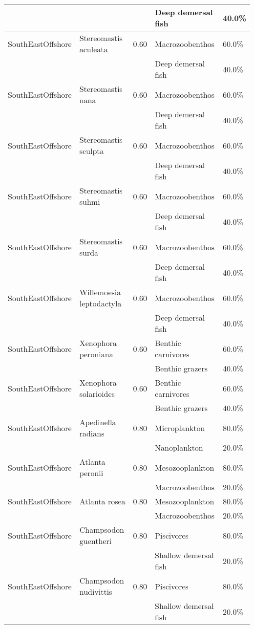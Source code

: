 \begin{longtable}{llcll}
& & & Deep demersal fish & 40.0\% \\
\hline
SouthEastOffshore & Stereomastis aculeata & 0.60 & Macrozoobenthos & 60.0\% \\
& & & Deep demersal fish & 40.0\% \\
\hline
SouthEastOffshore & Stereomastis nana & 0.60 & Macrozoobenthos & 60.0\% \\
& & & Deep demersal fish & 40.0\% \\
\hline
SouthEastOffshore & Stereomastis sculpta & 0.60 & Macrozoobenthos & 60.0\% \\
& & & Deep demersal fish & 40.0\% \\
\hline
SouthEastOffshore & Stereomastis suhmi & 0.60 & Macrozoobenthos & 60.0\% \\
& & & Deep demersal fish & 40.0\% \\
\hline
SouthEastOffshore & Stereomastis surda & 0.60 & Macrozoobenthos & 60.0\% \\
& & & Deep demersal fish & 40.0\% \\
\hline
SouthEastOffshore & Willemoesia leptodactyla & 0.60 & Macrozoobenthos & 60.0\% \\
& & & Deep demersal fish & 40.0\% \\
\hline
SouthEastOffshore & Xenophora peroniana & 0.60 & Benthic carnivores & 60.0\% \\
& & & Benthic grazers & 40.0\% \\
\hline
SouthEastOffshore & Xenophora solarioides & 0.60 & Benthic carnivores & 60.0\% \\
& & & Benthic grazers & 40.0\% \\
\hline
SouthEastOffshore & Apedinella radians & 0.80 & Microplankton & 80.0\% \\
& & & Nanoplankton & 20.0\% \\
\hline
SouthEastOffshore & Atlanta peronii & 0.80 & Mesozooplankton & 80.0\% \\
& & & Macrozoobenthos & 20.0\% \\
\hline
SouthEastOffshore & Atlanta rosea & 0.80 & Mesozooplankton & 80.0\% \\
& & & Macrozoobenthos & 20.0\% \\
\hline
SouthEastOffshore & Champsodon guentheri & 0.80 & Piscivores & 80.0\% \\
& & & Shallow demersal fish & 20.0\% \\
\hline
SouthEastOffshore & Champsodon nudivittis & 0.80 & Piscivores & 80.0\% \\
& & & Shallow demersal fish & 20.0\% \\

\end{longtable}
